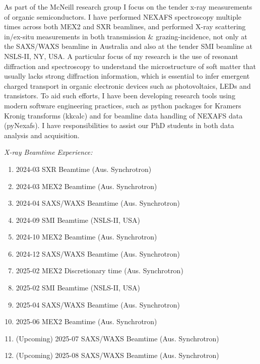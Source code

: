 \documentclass[10pt,a4paper,ragged2e,withhyper]{altacv}
\begin{document}
		{\textalignment
		As part of the McNeill research group I focus on the tender x-ray measurements of organic semiconductors. I have performed NEXAFS spectroscopy multiple times across both MEX2 and SXR beamlines, and performed X-ray scattering in/ex-situ measurements in both transmission \& grazing-incidence, not only at the SAXS/WAXS beamline in Australia and also at the tender SMI beamline at NSLS-II, NY, USA. A particular focus of my research is the use of resonant diffraction and spectroscopy to understand the microstructure of soft matter that usually lacks strong diffraction information, which is essential to infer emergent charged transport in organic electronic devices such as photovoltaics, LEDs and transistors. To aid such efforts, I have been developing research tools using modern software engineering practices, such as python packages for Kramers Kronig transforms (kkcalc) and for beamline data handling of NEXAFS data (pyNexafs). I have responsibilities to assist our PhD students in both data analysis and acquisition.
		}\vspace{1em}
		
		\textit{X-ray Beamtime Experience:}
		\vspace{-1em}
		\begin{multicols}{2}
			\begin{enumerate}
				\item 2024-03 SXR Beamtime (Aus. Synchrotron)
				\item 2024-03 MEX2 Beamtime (Aus. Synchrotron)
				\item 2024-04 SAXS/WAXS Beamtime (Aus. Synchrotron)
				\item 2024-09 SMI Beamtime (NSLS-II, USA)
				\item 2024-10 MEX2 Beamtime (Aus. Synchrotron)
				\item 2024-12 SAXS/WAXS Beamtime (Aus. Synchrotron)
				\item 2025-02 MEX2 Discretionary time (Aus. Synchrotron)
				\item 2025-02 SMI Beamtime (NSLS-II, USA)
				\item 2025-04 SAXS/WAXS Beamtime (Aus. Synchrotron)
				\item 2025-06 MEX2 Beamtime (Aus. Synchrotron)
				\item (Upcoming) 2025-07 SAXS/WAXS Beamtime (Aus. Synchrotron)
				\item (Upcoming) 2025-08 SAXS/WAXS Beamtime (Aus. Synchrotron)
			\end{enumerate}
		\end{multicols}
		\divider
	
\end{document}
